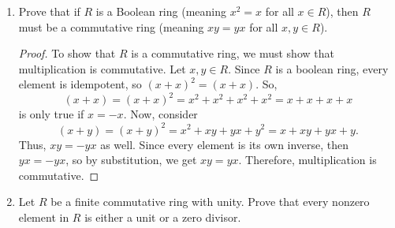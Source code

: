 \documentclass[12pt, oneside]{book}
\newcommand{\pf}[1]{
    \begin{customframedproof}[linecolor=orangehdx!75]
        \begin{proof}
        #1
        \end{proof}
    \end{customframedproof}
}
\begin{document}
\begin{enumerate}
    \pf{
        We will show that \(Z(R)\) is a subring by satisfying the subring axioms:
        \begin{enumerate}
            \item \(0 \in Z(R)\): Since \(0x = x0 = 0\), \(0 \in Z(R)\).
            \item \(a - b \in Z(R)\): Let \(a, b \in Z(R)\). Then
            \begin{align*}
                (a - b)r &= ar - br & \text{right distributive laws},\\
                &= ra - rb  & \text{since } a,b \in Z(R), \text{ they commute with } r,\\
                &= r(a - b) & \text{left distributive laws}.
            \end{align*}
            \item \(ab \in Z(R)\): Let \(a,b \in Z(R)\). Now, consider the computation
            \begin{align*}
                (ab)r &= a(br) & \text{associativity}, \\
                &= a(rb) & \text{since } b \in Z(R), \text{ it commutes with } r, \\
                &= (ar)b &\text{associativity}, \\
                &= (ra)b & \text{since } a \in Z(R), \text{ it commutes with } r, \\
                &= r(ab) & \text{associativity.}
            \end{align*}
        \end{enumerate}
        Therefore, we have shown that \(Z(R)\) is a subring of \(R\). 
    }
    \item Prove that if \(R\) is a Boolean ring (meaning \(x^{2} = x\) for all \(x \in R\)), then \(R\) must be a commutative ring (meaning \(xy = yx\) for all \(x,y \in R\)).
    \pf{
        To show that \(R\) is a commutative ring, we must show that multiplication is commutative. Let \(x, y \in R\). Since \(R\) is a boolean ring, every element is idempotent, so \((x + x)^{2} = (x + x)\). So, 
        \[
            (x + x) = (x + x)^{2} = x^{2} + x^{2} + x^{2} + x^{2} = x + x + x + x
        \] 
        is only true if \(x = -x\). Now, consider
        \[
            (x + y) = (x + y)^{2} = x^{2} + xy + yx + y^{2} = x + xy + yx + y.
        \]
        Thus, \(xy = -yx\) as well. Since every element is its own inverse, then \(yx = -yx\), so by substitution, we get \(xy = yx\). Therefore, multiplication is commutative.  
    }
    \item Let \(R\) be a finite commutative ring with unity. Prove that every nonzero element in \(R\) is either a unit or a zero divisor. 

\end{enumerate}
\end{document}
